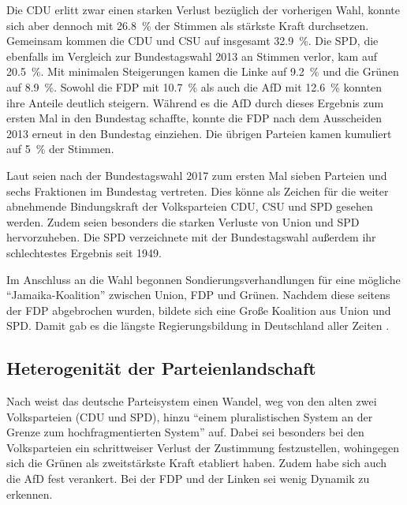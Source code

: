 Die \ac{CDU} erlitt zwar einen starken Verlust bezüglich der vorherigen Wahl, konnte sich aber dennoch mit \SI{26.8}{\percent} der Stimmen als stärkste Kraft durchsetzen. Gemeinsam kommen die \ac{CDU} und \acs{CSU} auf insgesamt \SI{32.9}{\percent}. Die \ac{SPD}, die ebenfalls im Vergleich zur Bundestagswahl \num{2013} an Stimmen verlor, kam auf \SI{20.5}{\percent}. Mit minimalen Steigerungen kamen die Linke auf \SI{9.2}{\percent} und die Grünen auf \SI{8.9}{\percent}. Sowohl die \ac{FDP} mit \SI{10.7}{\percent} als auch die \ac{AfD} mit \SI{12.6}{\percent} konnten ihre Anteile deutlich steigern. Während es die \ac{AfD} durch dieses Ergebnis zum ersten Mal in den Bundestag schaffte, konnte die \ac{FDP} nach dem Ausscheiden \num{2013} erneut in den Bundestag einziehen. Die übrigen Parteien kamen kumuliert auf \SI{5}{\percent} der Stimmen.

Laut \textcite{schmid_deutscher_2021} seien nach der Bundestagswahl \num{2017} zum ersten Mal sieben Parteien und sechs Fraktionen im Bundestag vertreten. Dies könne als Zeichen für die weiter abnehmende Bindungskraft der Volksparteien \ac{CDU}, \ac{CSU} und \ac{SPD} gesehen werden. Zudem seien besonders die starken Verluste von Union und \ac{SPD} hervorzuheben. Die \ac{SPD} verzeichnete mit der Bundestagswahl außerdem ihr schlechtestes Ergebnis seit \num{1949}.

Im Anschluss an die Wahl begonnen Sondierungsverhandlungen für eine mögliche \enquote{Jamaika-Koalition} zwischen Union, \ac{FDP} und Grünen. Nachdem diese seitens der \ac{FDP} abgebrochen wurden, bildete sich eine Große Koalition aus Union und \ac{SPD}. Damit gab es die längste Regierungsbildung in Deutschland aller Zeiten \parencite{schmid_deutscher_2021}.

\subsection{Heterogenität der Parteienlandschaft} \label{subsec:heterogenitätParteien}

Nach \textcite{niedermayer_entwicklung_2020} weist das deutsche Parteisystem einen Wandel, weg von den alten zwei Volksparteien (\ac{CDU} und \ac{SPD}), hinzu \enquote{einem pluralistischen System an der Grenze zum hochfragmentierten System} auf. Dabei sei besonders bei den Volksparteien ein schrittweiser Verlust der Zustimmung festzustellen, wohingegen sich die Grünen als zweitstärkste Kraft etabliert haben. Zudem habe sich auch die \ac{AfD} fest verankert. Bei der \ac{FDP} und der Linken sei wenig Dynamik zu erkennen.


